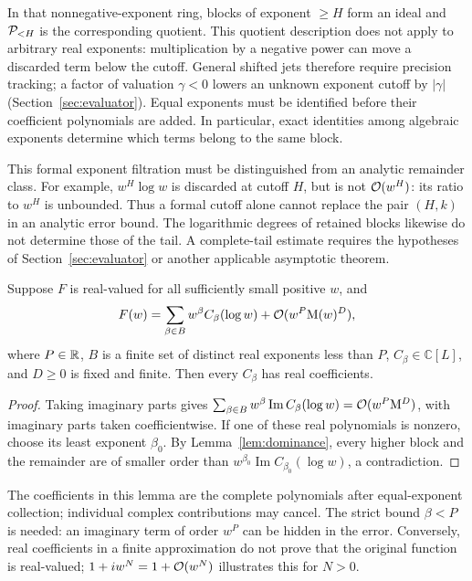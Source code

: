 In that nonnegative-exponent ring, blocks of exponent $\ge H$ form an ideal and $\mathcal P_{<H}$ is the corresponding quotient. This quotient description does not apply to arbitrary real exponents: multiplication by a negative power can move a discarded term below the cutoff. General shifted jets therefore require precision tracking; a factor of valuation $\gamma<0$ lowers an unknown exponent cutoff by $|\gamma|$ (Section~\ref{sec:evaluator}). Equal exponents must be identified before their coefficient polynomials are added. In particular, exact identities among algebraic exponents determine which terms belong to the same block.

This formal exponent filtration must be distinguished from an analytic
remainder class. For example, $w^H\log w$ is discarded at cutoff $H$,
but is not $\mathcal O(w^H)$: its ratio to $w^H$ is unbounded. Thus a formal
cutoff alone cannot replace the pair $(H,k)$ in an analytic error bound.
The logarithmic degrees of retained blocks likewise do not determine
those of the tail. A complete-tail estimate requires the hypotheses of
Section~\ref{sec:evaluator} or another applicable asymptotic theorem.

\begin{lemma}
\label{lem:real-resolved-coefficients}
Suppose $F$ is real-valued for all sufficiently small positive $w$, and
\[
 F(w)=\sum_{\beta\in B}w^\beta C_\beta(\log w)
       +\mathcal O(w^P\mathrm M(w)^D),
\]
where $P\in\mathbb R$, $B$ is a finite set of distinct real exponents less than $P$,
$C_\beta\in\mathbb C[L]$, and $D\ge0$ is fixed and finite.
Then every $C_\beta$ has real coefficients.
\end{lemma}
\begin{proof}
Taking imaginary parts gives
$\sum_{\beta\in B}w^\beta\operatorname{Im}C_\beta(\log w)
=\mathcal O(w^P\mathrm M^D)$, with imaginary parts taken coefficientwise.
If one of these real polynomials is nonzero, choose its least exponent
$\beta_0$. By Lemma~\ref{lem:dominance}, every higher block and the
remainder are of smaller order than
$w^{\beta_0}\operatorname{Im}C_{\beta_0}(\log w)$, a contradiction.
\end{proof}

The coefficients in this lemma are the complete polynomials after
equal-exponent collection; individual complex contributions may cancel.
The strict bound $\beta<P$ is needed: an imaginary term of order $w^P$
can be hidden in the error. Conversely, real coefficients in a finite
approximation do not prove that the original function is real-valued;
$1+i w^N=1+\mathcal O(w^N)$ illustrates this for $N>0$.

